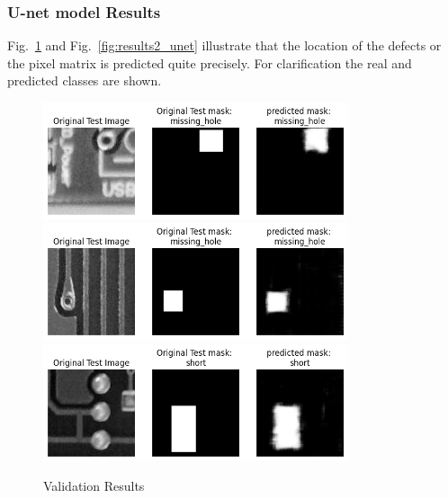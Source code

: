 \documentclass[12pt]{article}
\begin{document}
\clearpage

\subsubsection{U-net model Results}
Fig.~\ref{fig:results1_unet} and Fig.~\ref{fig:results2_unet} illustrate that the location of the defects or the pixel matrix is predicted quite precisely. For clarification the real and predicted classes are shown.
															  
\begin{figure}[h]
    \centering
    \includegraphics[width=0.8\textwidth]{./graphics/output1.png}
    \includegraphics[width=0.8\textwidth]{./graphics/output2.png}
    \includegraphics[width=0.8\textwidth]{./graphics/output3.png}

    \caption{Validation Results}
    \label{fig:results1_unet}
\end{figure}
\end{document}
